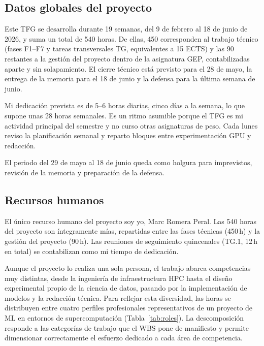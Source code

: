 \documentclass[11pt,a4paper]{article}
\begin{document}
\subsection{Datos globales del proyecto}

Este TFG se desarrolla durante 19 semanas, del 9 de febrero al 18 de junio de 2026, y suma un total de 540 horas. De ellas, 450 corresponden al trabajo técnico (fases F1--F7 y tareas transversales TG, equivalentes a 15 ECTS) y las 90 restantes a la gestión del proyecto dentro de la asignatura GEP, contabilizadas aparte y sin solapamiento. El cierre técnico está previsto para el 28 de mayo, la entrega de la memoria para el 18 de junio y la defensa para la última semana de junio.

Mi dedicación prevista es de 5--6 horas diarias, cinco días a la semana, lo que supone unas 28 horas semanales. Es un ritmo asumible porque el TFG es mi actividad principal del semestre y no curso otras asignaturas de peso. Cada lunes reviso la planificación semanal y reparto bloques entre experimentación GPU y redacción.

El periodo del 29 de mayo al 18 de junio queda como holgura para imprevistos, revisión de la memoria y preparación de la defensa.

\subsection{Recursos humanos}

El único recurso humano del proyecto soy yo, Marc Romera Peral. Las 540 horas del proyecto son íntegramente mías, repartidas entre las fases técnicas (450\,h) y la gestión del proyecto (90\,h). Las reuniones de seguimiento quincenales (TG.1, 12\,h en total) se contabilizan como mi tiempo de dedicación.

Aunque el proyecto lo realiza una sola persona, el trabajo abarca competencias muy distintas, desde la ingeniería de infraestructura HPC hasta el diseño experimental propio de la ciencia de datos, pasando por la implementación de modelos y la redacción técnica. Para reflejar esta diversidad, las horas se distribuyen entre cuatro perfiles profesionales representativos de un proyecto de ML en entornos de supercomputación (Tabla~\ref{tab:roles}). La descomposición responde a las categorías de trabajo que el WBS pone de manifiesto y permite dimensionar correctamente el esfuerzo dedicado a cada área de competencia.
\end{document}
